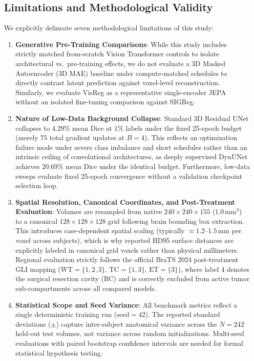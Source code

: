 \documentclass{article}
\begin{document}
\subsection{Limitations and Methodological Validity}
\label{sec:limitations}

We explicitly delineate seven methodological limitations of this study:
\begin{enumerate}
    \item \textbf{Generative Pre-Training Comparisons}: While this study includes strictly matched from-scratch Vision Transformer controls to isolate architectural vs.\ pre-training effects, we do not evaluate a 3D Masked Autoencoder (3D MAE) baseline under compute-matched schedules to directly contrast latent prediction against voxel-level reconstruction. Similarly, we evaluate VisReg as a representative single-encoder JEPA without an isolated fine-tuning comparison against SIGReg.
    \item \textbf{Nature of Low-Data Background Collapse}: Standard 3D Residual UNet collapses to $4.29\%$ mean Dice at $1\%$ labels under the fixed 25-epoch budget (merely $75$ total gradient updates at $B=4$). This reflects an optimization failure mode under severe class imbalance and short schedules rather than an intrinsic ceiling of convolutional architectures, as deeply supervised DynUNet achieves $20.69\%$ mean Dice under the identical budget. Furthermore, low-data sweeps evaluate fixed 25-epoch convergence without a validation checkpoint selection loop.
    \item \textbf{Spatial Resolution, Canonical Coordinates, and Post-Treatment Evaluation}: Volumes are resampled from native $240 \times 240 \times 155$ ($1.0\,\text{mm}^3$) to a canonical $128 \times 128 \times 128$ grid following brain bounding box extraction. This introduces case-dependent spatial scaling (typically $\approx 1.2\text{--}1.5\,\text{mm}$ per voxel across subjects), which is why reported HD95 surface distances are explicitly labeled in canonical grid voxels rather than physical millimeters. Regional evaluation strictly follows the official BraTS 2024 post-treatment GLI mapping ($\text{WT}=\{1,2,3\}$, $\text{TC}=\{1,3\}$, $\text{ET}=\{3\}$), where label 4 denotes the surgical resection cavity (RC) and is correctly excluded from active tumor sub-compartments across all compared models.
    \item \textbf{Statistical Scope and Seed Variance}: All benchmark metrics reflect a single deterministic training run ($\text{seed}=42$). The reported standard deviations ($\pm$) capture inter-subject anatomical variance across the $N=242$ held-out test volumes, not variance across random initializations. Multi-seed evaluations with paired bootstrap confidence intervals are needed for formal statistical hypothesis testing.

\end{enumerate}
\end{document}
